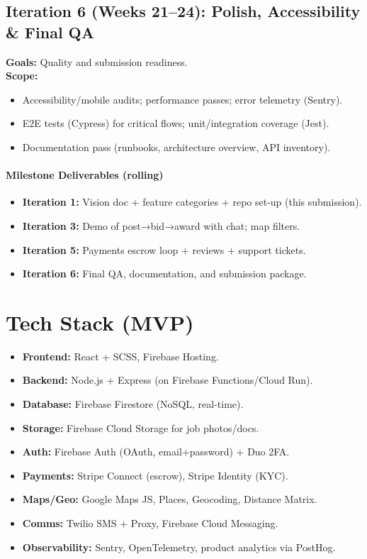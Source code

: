 \documentclass[11pt]{article}
\begin{document}
\subsection*{Iteration 6 (Weeks 21--24): Polish, Accessibility \& Final QA}
\textbf{Goals:} Quality and submission readiness. \\
\textbf{Scope:}
\begin{itemize}[leftmargin=1.4em]
  \item Accessibility/mobile audits; performance passes; error telemetry (Sentry).
  \item E2E tests (Cypress) for critical flows; unit/integration coverage (Jest).
  \item Documentation pass (runbooks, architecture overview, API inventory).
\end{itemize}

\paragraph{Milestone Deliverables (rolling)}
\begin{itemize}[leftmargin=1.4em]
  \item \textbf{Iteration 1:} Vision doc + feature categories + repo set-up (this submission).
  \item \textbf{Iteration 3:} Demo of post→bid→award with chat; map filters.
  \item \textbf{Iteration 5:} Payments escrow loop + reviews + support tickets.
  \item \textbf{Iteration 6:} Final QA, documentation, and submission package.
\end{itemize}
\section{Tech Stack (MVP)}
\begin{itemize}[leftmargin=1.4em]
  \item \textbf{Frontend:} React + SCSS, Firebase Hosting.
  \item \textbf{Backend:} Node.js + Express (on Firebase Functions/Cloud Run).
  \item \textbf{Database:} Firebase Firestore (NoSQL, real-time).
  \item \textbf{Storage:} Firebase Cloud Storage for job photos/docs.
  \item \textbf{Auth:} Firebase Auth (OAuth, email+password) + Duo 2FA.
  \item \textbf{Payments:} Stripe Connect (escrow), Stripe Identity (KYC).
  \item \textbf{Maps/Geo:} Google Maps JS, Places, Geocoding, Distance Matrix.
  \item \textbf{Comms:} Twilio SMS + Proxy, Firebase Cloud Messaging.
  \item \textbf{Observability:} Sentry, OpenTelemetry, product analytics via PostHog.
\end{itemize}
\end{document}
